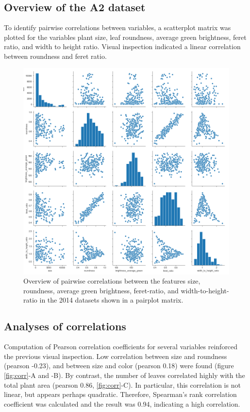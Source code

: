\documentclass[paper=A4,bibliography=totocnumbered]{scrartcl}
\begin{document}
\subsection{Overview of the A2 dataset}
To identify pairwise correlations between variables, a scatterplot matrix was plotted for the variables plant size, leaf roundness, average green brightness, feret ratio, and width to height ratio. Visual inspection indicated a linear correlation between roundness and feret ratio. 
 
\begin{figure}[h]
	\centering
	\includegraphics[width=13cm]{pic/overview}
	\caption{Overview of pairwise correlations between the features size, roundness, average green brightness, feret-ratio, and width-to-height-ratio in the 2014 datasets shown in a pairplot matrix.}
	\label{fig:overview}
\end{figure}

\subsection{Analyses of correlations}
Computation of Pearson correlation coefficients for several variables reinforced the previous visual inspection. Low correlation between size and roundness (pearson -0.23), and between size and color (pearson 0.18) were found (figure \ref{fig:corr}-A and -B). By contrast, the number of leaves correlated highly with the total plant area (pearson 0.86, \ref{fig:corr}-C). In particular, this correlation is not linear, but appears perhaps quadratic. Therefore, Spearman's rank correlation coefficient was calculated and the result was 0.94, indicating a high correlation. 
\end{document}
